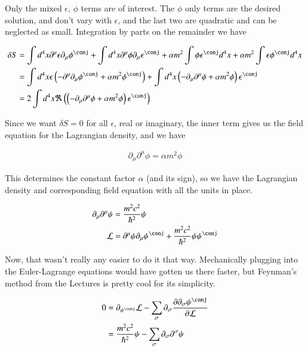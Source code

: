 \documentclass{article}
\begin{document}
Only the mixed $\epsilon$, $\phi$ terms are of interest.  The $\phi$ only terms are the desired solution, and don't vary with $\epsilon$, and the last two are
quadratic and can be neglected as small.  Integration by parts on the remainder we have

\begin{align*}
\delta S
&=
\int d^4 x \partial^\mu \epsilon \partial_\mu \phi^\conj
+ \int d^4 x \partial^\mu \phi \partial_\mu \epsilon^\conj
+ \alpha m^2 \int \phi \epsilon^\conj  d^4 x
+ \alpha m^2 \int \epsilon \phi^\conj  d^4 x \\
&=
\int d^4 x \epsilon \left( -\partial^\mu \partial_\mu \phi^\conj + \alpha m^2 \phi^\conj \right)
+ \int d^4 x \left( -\partial_\mu \partial^\mu \phi + \alpha m^2 \phi \right) \epsilon^\conj
\\
&=
2 \int d^4 x \Re \left( \left( -\partial_\mu \partial^\mu \phi + \alpha m^2 \phi \right) \epsilon^\conj  \right) \\
\end{align*}

Since we want $\delta S = 0$ for all $\epsilon$, real or imaginary, the inner term gives us the field equation for the Lagrangian density, and we have

\begin{align*}
\partial_\mu \partial^\mu \phi = \alpha m^2 \phi
\end{align*}

This determines the constant factor $\alpha$ (and its sign), so we have the Lagrangian density and corresponding field equation
with all the units in place.

\begin{align}\label{eqn:withConstant}
\partial_\mu \partial^\mu \psi &= \frac{m^2 c^2}{\hbar^2} \psi \\
\LL &= \partial^\mu \psi \partial_\mu \psi^\conj + \frac{m^2 c^2}{\hbar^2}\psi \psi^\conj
\end{align}

Now, that wasn't really any easier to do it that way.  Mechanically plugging into the Euler-Lagrange equations would have gotten us there
faster, but Feynman's method from the Lectures
\cite{feynman1963flp}
is pretty cool for its simplicity.

\begin{align*}
0
&= \partial_{\psi^\conj}\LL - \sum_\sigma \partial_\sigma \PD{\partial_\sigma \psi^\conj}{\LL} \\
&= \frac{m^2 c^2}{\hbar^2}\psi - \sum_\sigma \partial_\sigma \partial^\sigma \psi
\end{align*}
\end{document}
